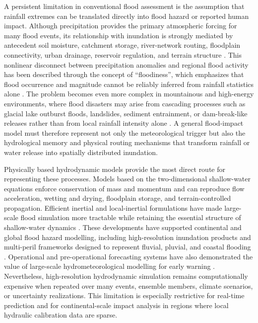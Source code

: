 \documentclass[pdflatex,sn-mathphys-ay]{sn-jnl}
\theoremstyle{thmstyleone}
\begin{document}
A persistent limitation in conventional flood assessment is the
assumption that rainfall extremes can be translated directly into flood
hazard or reported human impact.  Although precipitation provides the
primary atmospheric forcing for many flood events, its relationship
with inundation is strongly mediated by antecedent soil moisture,
catchment storage, river-network routing, floodplain connectivity,
urban drainage, reservoir regulation, and terrain structure \citep{Wing2024,Najafi2024ImpactBasedFloodWarning,Hersbach2020,NASH1970282,YANG2026103056}.  This
nonlinear disconnect between precipitation anomalies and regional flood
activity has been described through the concept of ``floodiness'',
which emphasizes that flood occurrence and magnitude cannot be
reliably inferred from rainfall statistics alone
\citep{Stephens2015}.  The problem becomes even more complex in
mountainous and high-energy environments, where flood disasters may
arise from cascading processes such as glacial lake outburst floods,
landslides, sediment entrainment, or dam-break-like releases rather
than from local rainfall intensity alone \citep{Sattar2025}.  A
general flood-impact model must therefore represent not only the
meteorological trigger but also the hydrological memory and physical
routing mechanisms that transform rainfall or water release into
spatially distributed inundation.

Physically based hydrodynamic models provide the most direct route for
representing these processes.  Models based on the two-dimensional
shallow-water equations enforce conservation of mass and momentum and
can reproduce flow acceleration, wetting and drying, floodplain
storage, and terrain-controlled propagation.  Efficient inertial and
local-inertial formulations have made large-scale flood simulation more
tractable while retaining the essential structure of shallow-water
dynamics \citep{Bates2010,Almeida2013,Xia2017,Bates2022}.  These developments
have supported continental and global flood hazard modelling, including
high-resolution inundation products and multi-peril frameworks
designed to represent fluvial, pluvial, and coastal flooding
\citep{Sampson2015,Dottori2016,Trigg2016,Wing2019,Bates2023,Wing2024}.  Operational and
pre-operational forecasting systems have also demonstrated the value of
large-scale hydrometeorological modelling for early warning
\citep{Thielen2009,Alfieri2013,Emerton2016,Alfieri2019,Pappenberger2015,Najafi2024ImpactBasedFloodWarning}.  Nevertheless,
high-resolution hydrodynamic simulation remains computationally
expensive when repeated over many events, ensemble members, climate
scenarios, or uncertainty realizations.  This limitation is especially
restrictive for real-time prediction and for continental-scale impact
analysis in regions where local hydraulic calibration data are sparse.
\end{document}
